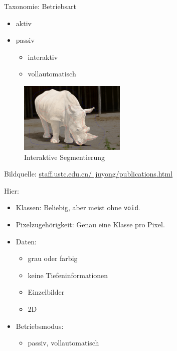 \begin{frame}{Taxonomie: Betriebsart}
    \begin{itemize}
        \item aktiv
        \item passiv
        \begin{itemize}
            \item interaktiv
            \item vollautomatisch
        \end{itemize}
    \end{itemize}
    \begin{figure}[ht]
            \centering
            \includegraphics[width=0.45\textwidth]{../images/TIP-1.jpg}
            \caption{Interaktive Segmentierung}
    \end{figure}
    {\tiny Bildquelle: \href{http://staff.ustc.edu.cn/~juyong/publications.html}{staff.ustc.edu.cn/~juyong/publications.html}}
\end{frame}

\begin{frame}{Hier:}
    \begin{itemize}
        \item Klassen: Beliebig, aber meist ohne \texttt{void}.
        \item Pixelzugehörigkeit: Genau eine Klasse pro Pixel.
        \item Daten:
        \begin{itemize}
            \item grau oder farbig
            \item keine Tiefeninformationen
            \item Einzelbilder
            \item 2D
        \end{itemize}
        \item Betriebsmodus:
        \begin{itemize}
            \item passiv, vollautomatisch
        \end{itemize}
    \end{itemize}
\end{frame}
